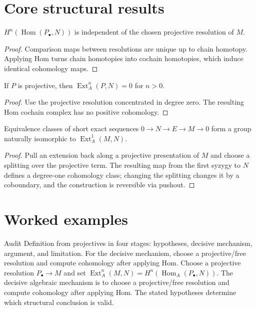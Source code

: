 \section{Core structural results}

\begin{theorem}\label{thm:v27-01}
$H^n(\operatorname{Hom}(P_\bullet,N))$ is independent of the chosen projective resolution of $M$.
\begin{proof}
Comparison maps between resolutions are unique up to chain homotopy. Applying Hom turns chain homotopies into cochain homotopies, which induce identical cohomology maps.
\end{proof}
\end{theorem}

\begin{theorem}\label{thm:v27-02}
If $P$ is projective, then $\operatorname{Ext}_A^n(P,N)=0$ for $n>0$.
\begin{proof}
Use the projective resolution concentrated in degree zero. The resulting Hom cochain complex has no positive cohomology.
\end{proof}
\end{theorem}

\begin{theorem}\label{thm:v27-03}
Equivalence classes of short exact sequences $0\to N\to E\to M\to0$ form a group naturally isomorphic to $\operatorname{Ext}_A^1(M,N)$.
\begin{proof}
Pull an extension back along a projective presentation of $M$ and choose a splitting over the projective term. The resulting map from the first syzygy to $N$ defines a degree-one cohomology class; changing the splitting changes it by a coboundary, and the construction is reversible via pushout.
\end{proof}
\end{theorem}

\section{Worked examples}

\begin{example}\label{ex:v27-worked-01}
Audit Definition from projectives in four stages: hypotheses, decisive mechanism, argument, and limitation. For the decisive mechanism, choose a projective/free resolution and compute cohomology after applying Hom. Choose a projective resolution $P_\bullet\to M$ and set $\operatorname{Ext}_A^n(M,N)=H^n(\operatorname{Hom}_A(P_\bullet,N))$. The decisive algebraic mechanism is to choose a projective/free resolution and compute cohomology after applying Hom. The stated hypotheses determine which structural conclusion is valid.
\end{example}

